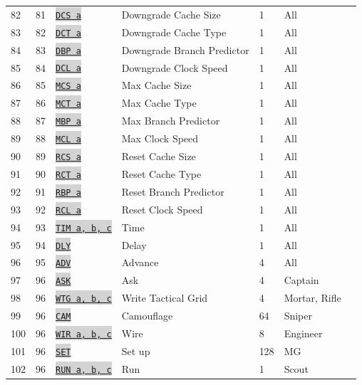\documentclass{article}
\newcommand{\vnscode}[1]{\colorbox{lightgray}{\lstinline[language=vns]{#1}}}
\begin{document}
\begin{longtable}{lllllll}
    82 & 81 & \hyperref[table:upgrade]{\vnscode{DCS a}} & Downgrade Cache Size & 1 & All \\
    83 & 82 & \hyperref[table:upgrade]{\vnscode{DCT a}} & Downgrade Cache Type & 1 & All \\
    84 & 83 & \hyperref[table:upgrade]{\vnscode{DBP a}} & Downgrade Branch Predictor & 1 & All \\
    85 & 84 & \hyperref[table:upgrade]{\vnscode{DCL a}} & Downgrade Clock Speed & 1 & All \\
    86 & 85 & \hyperref[table:upgrade]{\vnscode{MCS a}} & Max Cache Size & 1 & All \\
    87 & 86 & \hyperref[table:upgrade]{\vnscode{MCT a}} & Max Cache Type & 1 & All \\
    88 & 87 & \hyperref[table:upgrade]{\vnscode{MBP a}} & Max Branch Predictor & 1 & All \\
    89 & 88 & \hyperref[table:upgrade]{\vnscode{MCL a}} & Max Clock Speed & 1 & All \\
    90 & 89 & \hyperref[table:upgrade]{\vnscode{RCS a}} & Reset Cache Size & 1 & All \\
    91 & 90 & \hyperref[table:upgrade]{\vnscode{RCT a}} & Reset Cache Type & 1 & All \\
    92 & 91 & \hyperref[table:upgrade]{\vnscode{RBP a}} & Reset Branch Predictor & 1 & All \\
    93 & 92 & \hyperref[table:upgrade]{\vnscode{RCL a}} & Reset Clock Speed & 1 & All \\
    94 & 93 & \hyperref[table:time]{\vnscode{TIM a, b, c}} & Time & 1 & All \\
    95 & 94 & \hyperref[table:time]{\vnscode{DLY}} & Delay & 1 & All \\
    96 & 95 & \hyperref[table:time]{\vnscode{ADV}} & Advance & 4 & All \\
    97 & 96 & \hyperref[table:resource]{\vnscode{ASK}} & Ask & 4 & Captain \\
    98 & 96 & \hyperref[table:grid]{\vnscode{WTG a, b, c}} & Write Tactical Grid & 4 & Mortar, Rifle \\
    99 & 96 & \hyperref[table:sniper]{\vnscode{CAM}} & Camouflage & 64 & Sniper \\
    100 & 96 & \hyperref[table:combat]{\vnscode{WIR a, b, c}} & Wire & 8 & Engineer \\
    101 & 96 & \hyperref[table:combat]{\vnscode{SET}} & Set up & 128 & MG \\
    102 & 96 & \hyperref[table:movement]{\vnscode{RUN a, b, c}} & Run & 1 & Scout \\

\end{longtable}
\end{document}
